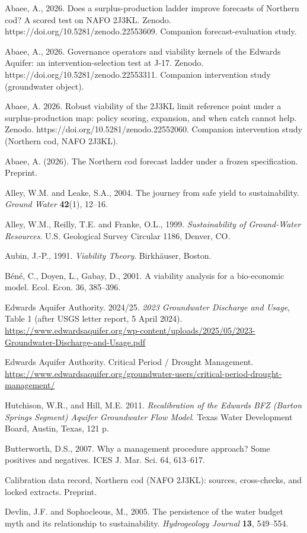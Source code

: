 \documentclass[11pt]{article}
\begin{document}
Abaee, A., 2026. Does a surplus-production ladder improve forecasts of
Northern cod? A scored test on NAFO 2J3KL. Zenodo.
https://doi.org/10.5281/zenodo.22553609. Companion forecast-evaluation
study.

Abaee, A., 2026. Governance operators and viability kernels of the
Edwards Aquifer: an intervention-selection test at J-17. Zenodo.
https://doi.org/10.5281/zenodo.22553311. Companion intervention study
(groundwater object).

Abaee, A. 2026. Robust viability of the 2J3KL limit reference point
under a surplus-production map: policy scoring, expansion, and when
catch cannot help. Zenodo. https://doi.org/10.5281/zenodo.22552060.
Companion intervention study (Northern cod, NAFO 2J3KL).

Abaee, A. (2026). The Northern cod forecast ladder under a frozen
specification. Preprint.

Alley, W.M. and Leake, S.A., 2004. The journey from safe yield to sustainability.
\emph{Ground Water} \textbf{42}(1), 12--16.

Alley, W.M., Reilly, T.E. and Franke, O.L., 1999. \emph{Sustainability of Ground-Water
Resources}. U.S. Geological Survey Circular 1186, Denver, CO.

Aubin, J.-P., 1991. \emph{Viability Theory}. Birkh\"auser, Boston.


B\'en\'e, C., Doyen, L., Gabay, D., 2001. A viability analysis for a
bio-economic model. Ecol. Econ. 36, 385--396.

Edwards Aquifer Authority. 2024/25. \emph{2023 Groundwater Discharge and
Usage}, Table 1 (after USGS letter report, 5 April 2024).
\url{https://www.edwardsaquifer.org/wp-content/uploads/2025/05/2023-Groundwater-Discharge-and-Usage.pdf}

Edwards Aquifer Authority. Critical Period / Drought Management.
\url{https://www.edwardsaquifer.org/groundwater-users/critical-period-drought-management/}

Hutchison, W.R., and Hill, M.E. 2011. \emph{Recalibration of the Edwards
BFZ (Barton Springs Segment) Aquifer Groundwater Flow Model}. Texas
Water Development Board, Austin, Texas, 121 p.

Butterworth, D.S., 2007. Why a management procedure approach? Some positives and negatives.
ICES J. Mar. Sci. 64, 613--617.

Calibration data record, Northern cod (NAFO 2J3KL):
sources, cross-checks, and locked extracts. Preprint.

Devlin, J.F. and Sophocleous, M., 2005. The persistence of the water budget myth and its
relationship to sustainability. \emph{Hydrogeology Journal} \textbf{13}, 549--554.
\end{document}

